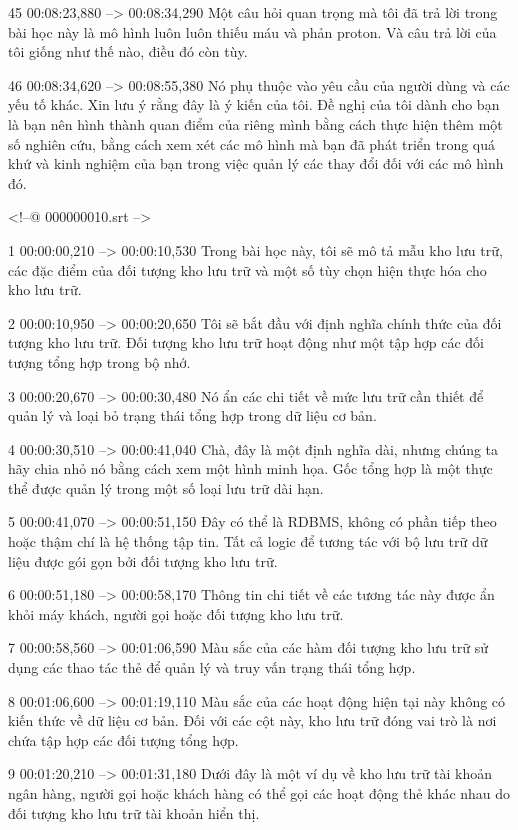 45
00:08:23,880 --> 00:08:34,290
Một câu hỏi quan trọng mà tôi đã trả lời trong bài học này là mô hình luôn luôn thiếu máu và phản proton.  Và câu trả lời của tôi giống như thế nào, điều đó còn tùy.

46
00:08:34,620 --> 00:08:55,380
Nó phụ thuộc vào yêu cầu của người dùng và các yếu tố khác.  Xin lưu ý rằng đây là ý kiến ​​​​của tôi.  Đề nghị của tôi dành cho bạn là bạn nên hình thành quan điểm của riêng mình bằng cách thực hiện thêm một số nghiên cứu, bằng cách xem xét các mô hình mà bạn đã phát triển trong quá khứ và kinh nghiệm của bạn trong việc quản lý các thay đổi đối với các mô hình đó.

<!--@ 000000010.srt -->

1
00:00:00,210 --> 00:00:10,530
Trong bài học này, tôi sẽ mô tả mẫu kho lưu trữ, các đặc điểm của đối tượng kho lưu trữ và một số tùy chọn hiện thực hóa cho kho lưu trữ.

2
00:00:10,950 --> 00:00:20,650
Tôi sẽ bắt đầu với định nghĩa chính thức của đối tượng kho lưu trữ.  Đối tượng kho lưu trữ hoạt động như một tập hợp các đối tượng tổng hợp trong bộ nhớ.

3
00:00:20,670 --> 00:00:30,480
Nó ẩn các chi tiết về mức lưu trữ cần thiết để quản lý và loại bỏ trạng thái tổng hợp trong dữ liệu cơ bản.

4
00:00:30,510 --> 00:00:41,040
Chà, đây là một định nghĩa dài, nhưng chúng ta hãy chia nhỏ nó bằng cách xem một hình minh họa.  Gốc tổng hợp là một thực thể được quản lý trong một số loại lưu trữ dài hạn.

5
00:00:41,070 --> 00:00:51,150
Đây có thể là RDBMS, không có phần tiếp theo hoặc thậm chí là hệ thống tập tin.  Tất cả logic để tương tác với bộ lưu trữ dữ liệu được gói gọn bởi đối tượng kho lưu trữ.

6
00:00:51,180 --> 00:00:58,170
Thông tin chi tiết về các tương tác này được ẩn khỏi máy khách, người gọi hoặc đối tượng kho lưu trữ.

7
00:00:58,560 --> 00:01:06,590
Màu sắc của các hàm đối tượng kho lưu trữ sử dụng các thao tác thẻ để quản lý và truy vấn trạng thái tổng hợp.

8
00:01:06,600 --> 00:01:19,110
Màu sắc của các hoạt động hiện tại này không có kiến ​​thức về dữ liệu cơ bản.  Đối với các cột này, kho lưu trữ đóng vai trò là nơi chứa tập hợp các đối tượng tổng hợp.

9
00:01:20,210 --> 00:01:31,180
Dưới đây là một ví dụ về kho lưu trữ tài khoản ngân hàng, người gọi hoặc khách hàng có thể gọi các hoạt động thẻ khác nhau do đối tượng kho lưu trữ tài khoản hiển thị.

